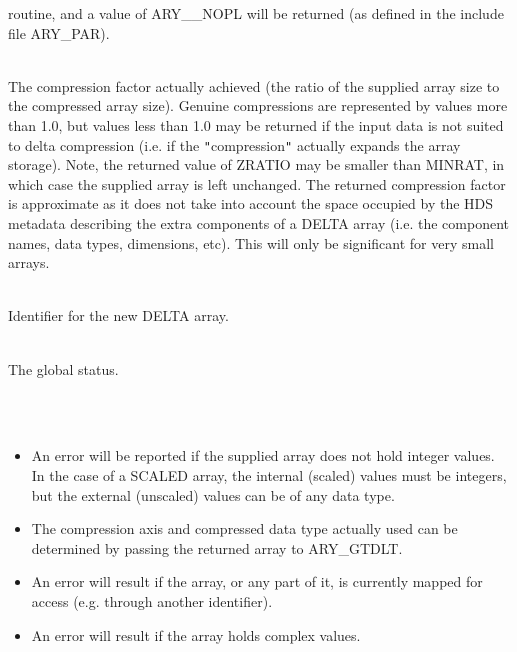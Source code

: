 \documentclass[twoside,11pt]{article}
\newcommand{\sstsubsection}[1]{ \item[{#1}] \mbox{} \\}
\newcommand{\sstnotes}[1]{\item[Notes:] \mbox{} \\[1.3ex] #1}
\newcommand{\sstitemlist}[1]{
  \mbox{} \\
  \vspace{-3.5ex}
  \begin{itemize}
     #1
  \end{itemize}
}
\newcommand{\sstitem}{\item}
\newcommand{\sstsubsection}[1]{\item[{#1}]}
\newcommand{\sstnotes}[1]{\item[Notes:]
      \begin{description}
         #1
      \end{description}
   }
\newcommand{\sstitemlist}[1]{
      \begin{itemize}
         #1
      \end{itemize}
   }
\begin{document}
{{{         routine, and a value of ARY\_\_NOPL will be returned (as defined
         in the include file ARY\_PAR).
      }
      \sstsubsection{
         ZRATIO = REAL (Returned)
      }{
         The compression factor actually achieved (the ratio of the
         supplied array size to the compressed array size). Genuine
         compressions are represented by values more than 1.0, but values
         less than 1.0 may be returned if the input data is not suited
         to delta compression (i.e. if the {\tt "}compression{\tt "} actually expands
         the array storage). Note, the returned value of ZRATIO may be
         smaller than MINRAT, in which case the supplied array is left
         unchanged. The returned compression factor is approximate as it
         does not take into account the space occupied by the HDS metadata
         describing the extra components of a DELTA array (i.e. the
         component names, data types, dimensions, etc). This will only be
         significant for very small arrays.
      }
      \sstsubsection{
         IARY2 = INTEGER (Returned)
      }{
         Identifier for the new DELTA array.
      }
      \sstsubsection{
         STATUS = INTEGER (Given and Returned)
      }{
         The global status.
      }
   }
   \sstnotes{
      \sstitemlist{

         \sstitem
         An error will be reported if the supplied array does not hold
         integer values. In the case of a SCALED array, the internal
         (scaled) values must be integers, but the external (unscaled) values
         can be of any data type.

         \sstitem
         The compression axis and compressed data type actually used can
         be determined by passing the returned array to ARY\_GTDLT.

         \sstitem
         An error will result if the array, or any part of it, is
         currently mapped for access (e.g. through another identifier).

         \sstitem
         An error will result if the array holds complex values.
      }
   }
}
\end{document}

